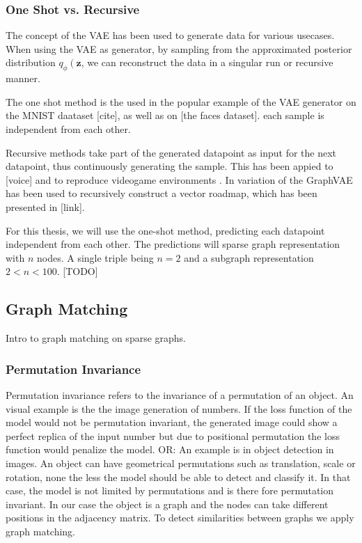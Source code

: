 \subsubsection{One Shot vs. Recursive}
The concept of the VAE has been used to generate data for various usecases. When using the VAE as generator, by sampling from the approximated posterior distribution $q_{\phi}\left(\mathbf{z}$, we can reconstruct the data in a singular run or recursive manner.

The one shot method is the used in the popular example of the VAE generator on the MNIST daataset [cite], as well as on [the faces dataset]. each sample is independent from each other.

Recursive methods take part of the generated datapoint as input for the next datapoint, thus continuously generating the sample. This has been appied to [voice] and to reproduce videogame environments \cite{ha_world_2018}. In \cite{belli_image-conditioned_2019} variation of the GraphVAE has been used to recursively construct a vector roadmap, which has been presented in [link].

For this thesis, we will use the one-shot method, predicting each datapoint independent from each other. The predictions will sparse graph representation with $n$ nodes. A single triple being $n=2$ and a subgraph representation $2<n<100$. [TODO]


\subsection{Graph Matching}
Intro to graph matching on sparse graphs.

\subsubsection{Permutation Invariance}


Permutation invariance refers to the invariance of a permutation of an object. An visual example is the the image generation of numbers. If the loss function of the model would not be permutation invariant, the generated image could show a perfect replica of the input number but due to positional permutation the loss function would penalize the model. 
OR: An example is in object detection in images. An object can have geometrical permutations such as translation, scale or rotation, none the less the model should be able to detect and classify it. In that case, the model is not limited by permutations and  is there fore permutation invariant.
In our case the object is a graph and the nodes can take different positions in the adjacency matrix. To detect similarities between graphs we apply graph matching.

